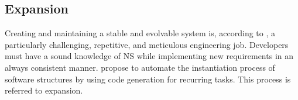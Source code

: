 \subsection{Expansion} \label{subsec_expansion}

Creating and maintaining a stable and evolvable system is, according to
\textcite[403]{mannaert_normalized_2016}, a particularly challenging, repetitive, and
meticulous engineering job. Developers must have a sound knowledge of NS while
implementing new requirements in an always consistent manner.
\textcite[403]{mannaert_normalized_2016} propose to automate the instantiation process of
software structures by using code generation for recurring tasks. This process is referred
to expansion.

